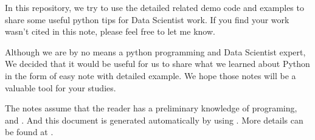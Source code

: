 \documentclass[letterpaper,12pt,english]{sphinxmanual}
\begin{document}
In this repository, we try to use the detailed  related demo code and
examples to share some useful python tips for Data Scientist work. If you
find your work wasn’t cited in this note, please feel free to let me know.

Although we are by no means a python programming and Data Scientist expert,
We decided that it would be useful for us to share what we learned
about Python in the form of easy note with detailed example.
We hope those notes will be a valuable tool for your studies.

The notes assume that the reader has a preliminary knowledge of  programing,  and . And this document is generated automatically by using . More details can be found at .
\end{document}

